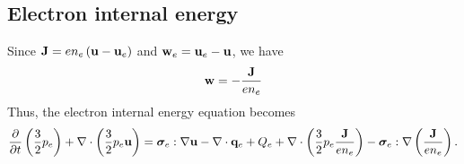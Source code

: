 \documentclass[a4paper,11pt]{report}
\begin{document}
\subsection{Electron internal energy}

Since $\mathbf{J} = e n_e \left( \mathbf{u} - \mathbf{u}_e \right)$ and $\mathbf{w}_e = \mathbf{u}_e - \mathbf{u}$, we have
\begin{equation}
    \label{eq:mhd_from_w_to_J}
    \mathbf{w} = -\frac{\mathbf{J}}{e n_e} 
\end{equation}
Thus, the electron internal energy equation becomes
\begin{equation*}
    \frac{\partial}{\partial t} \left( \frac{3}{2} p_e \right) + \nabla \cdot \left( \frac{3}{2} p_e \mathbf{u} \right) = \bm \sigma_e : \nabla \mathbf{u} - \nabla \cdot \mathbf{q}_e + Q_e + \nabla \cdot \left( \frac{3}{2} p_e \frac{\mathbf{J}}{e n_e} \right) - \bm \sigma_e : \nabla \left( \frac{\mathbf{J}}{e n_e} \right).
\end{equation*}
\end{document}
